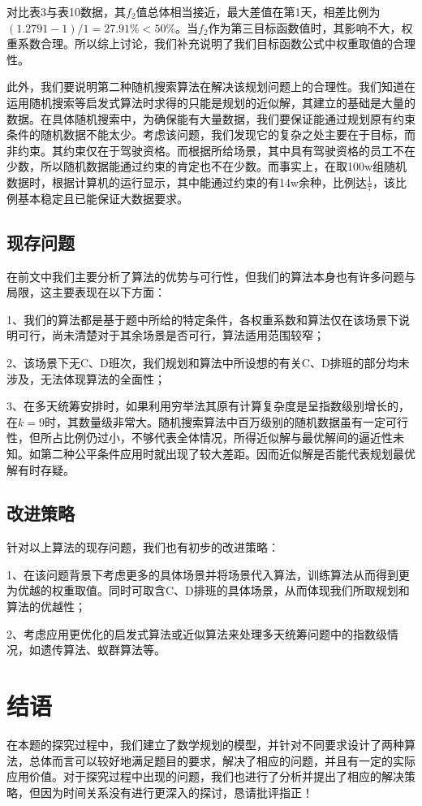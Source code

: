 \documentclass{article}
\begin{document}
    对比表3与表10数据，其$f_2$值总体相当接近，最大差值在第1天，相差比例为$(1.2791-1)/1=27.91\%<50\%$。当$f_2$作为第三目标函数值时，其影响不大，权重系数合理。所以综上讨论，我们补充说明了我们目标函数公式中权重取值的合理性。
    
    此外，我们要说明第二种随机搜索算法在解决该规划问题上的合理性。我们知道在运用随机搜索等启发式算法时求得的只能是规划的近似解，其建立的基础是大量的数据。在具体随机搜索中，为确保能有大量数据，我们要保证能通过规划原有约束条件的随机数据不能太少。考虑该问题，我们发现它的复杂之处主要在于目标，而非约束。其约束仅在于驾驶资格。而根据所给场景，其中具有驾驶资格的员工不在少数，所以随机数据能通过约束的肯定也不在少数。而事实上，在取100w组随机数据时，根据计算机的运行显示，其中能通过约束的有14w余种，比例达$\frac{1}{7}$，该比例基本稳定且已能保证大数据要求。
	\subsection{现存问题}
	在前文中我们主要分析了算法的优势与可行性，但我们的算法本身也有许多问题与局限，这主要表现在以下方面：
	
	1、我们的算法都是基于题中所给的特定条件，各权重系数和算法仅在该场景下说明可行，尚未清楚对于其余场景是否可行，算法适用范围较窄；
	
	2、该场景下无C、D班次，我们规划和算法中所设想的有关C、D排班的部分均未涉及，无法体现算法的全面性；
	
	3、在多天统筹安排时，如果利用穷举法其原有计算复杂度是呈指数级别增长的，在$k=9$时，其数量级非常大。随机搜索算法中百万级别的随机数据虽有一定可行性，但所占比例仍过小，不够代表全体情况，所得近似解与最优解间的逼近性未知。如第二种公平条件应用时就出现了较大差距。因而近似解是否能代表规划最优解有时存疑。
	\subsection{改进策略}
	针对以上算法的现存问题，我们也有初步的改进策略：
	
	1、在该问题背景下考虑更多的具体场景并将场景代入算法，训练算法从而得到更为优越的权重取值。同时可取含C、D排班的具体场景，从而体现我们所取规划和算法的优越性；
	
	2、考虑应用更优化的启发式算法或近似算法来处理多天统筹问题中的指数级情况，如遗传算法、蚁群算法等。

	\section{结语}
	在本题的探究过程中，我们建立了数学规划的模型，并针对不同要求设计了两种算法，总体而言可以较好地满足题目的要求，解决了相应的问题，并且有一定的实际应用价值。对于探究过程中出现的问题，我们也进行了分析并提出了相应的解决策略，但因为时间关系没有进行更深入的探讨，恳请批评指正！
	
\end{document}
